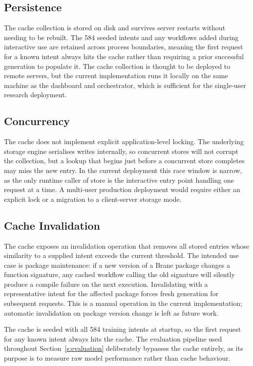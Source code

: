 \subsection{Persistence}

The cache collection is stored on disk and survives server restarts without
needing to be rebuilt. The 584 seeded intents and any workflows added during
interactive use are retained across process boundaries, meaning the first
request for a known intent always hits the cache rather than requiring a
prior successful generation to populate it.
The cache collection is thought to be deployed to remote servers, but the current implementation
runs it locally on the same machine as the dashboard and orchestrator, which is sufficient for
the single-user research deployment.

\subsection{Concurrency}

The cache does not implement explicit application-level locking. The
underlying storage engine serialises writes internally, so concurrent stores
will not corrupt the collection, but a lookup that begins just before a
concurrent store completes may miss the new entry. In the current deployment
this race window is narrow, as the only runtime caller of store is the
interactive entry point handling one request at a time. A multi-user
production deployment would require either an explicit lock or a migration to
a client-server storage mode.

\subsection{Cache Invalidation}

The cache exposes an invalidation operation that removes all stored entries
whose similarity to a supplied intent exceeds the current threshold. The
intended use case is package maintenance: if a new version of a Brane package
changes a function signature, any cached workflow calling the old signature
will silently produce a compile failure on the next execution. Invalidating
with a representative intent for the affected package forces fresh generation
for subsequent requests. This is a manual operation in the current
implementation; automatic invalidation on package version change is left as
future work.

The cache is seeded with all 584 training intents at startup, so the first
request for any known intent always hits the cache. The evaluation pipeline
used throughout Section~\ref{s:evaluation} deliberately bypasses the cache entirely, 
as its purpose is to measure raw model performance rather than cache behaviour.

